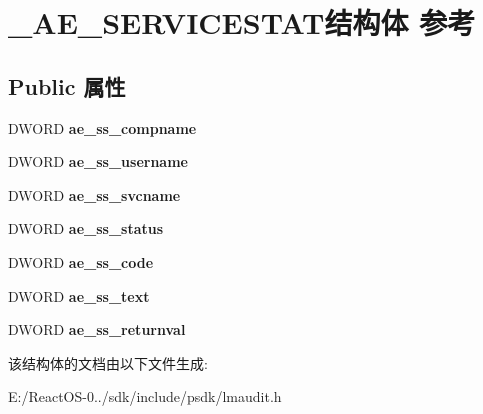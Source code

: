 \hypertarget{struct___a_e___s_e_r_v_i_c_e_s_t_a_t}{}\section{\+\_\+\+A\+E\+\_\+\+S\+E\+R\+V\+I\+C\+E\+S\+T\+A\+T结构体 参考}
\label{struct___a_e___s_e_r_v_i_c_e_s_t_a_t}
\subsection*{Public 属性}
\begin{DoxyCompactItemize}
\item 
\mbox{\label{struct___a_e___s_e_r_v_i_c_e_s_t_a_t_a2477317641e2fb9f72ddf344db135104}} 
D\+W\+O\+RD {\bfseries ae\+\_\+ss\+\_\+compname}
\item 
\mbox{\label{struct___a_e___s_e_r_v_i_c_e_s_t_a_t_aa83a45b295efb3880e1ace4e23b5fed9}} 
D\+W\+O\+RD {\bfseries ae\+\_\+ss\+\_\+username}
\item 
\mbox{\label{struct___a_e___s_e_r_v_i_c_e_s_t_a_t_abf8f866672d85936f0d2d35b3e78169b}} 
D\+W\+O\+RD {\bfseries ae\+\_\+ss\+\_\+svcname}
\item 
\mbox{\label{struct___a_e___s_e_r_v_i_c_e_s_t_a_t_acdc4158484ad0cbc6eb5de8c94ca3022}} 
D\+W\+O\+RD {\bfseries ae\+\_\+ss\+\_\+status}
\item 
\mbox{\label{struct___a_e___s_e_r_v_i_c_e_s_t_a_t_a497cc87c5abfab742533366f46d7af74}} 
D\+W\+O\+RD {\bfseries ae\+\_\+ss\+\_\+code}
\item 
\mbox{\label{struct___a_e___s_e_r_v_i_c_e_s_t_a_t_a9387b5d90388d500b1635b95df299594}} 
D\+W\+O\+RD {\bfseries ae\+\_\+ss\+\_\+text}
\item 
\mbox{\label{struct___a_e___s_e_r_v_i_c_e_s_t_a_t_ad55c8f11a9cff64c095ba1b3ae000949}} 
D\+W\+O\+RD {\bfseries ae\+\_\+ss\+\_\+returnval}
\end{DoxyCompactItemize}


该结构体的文档由以下文件生成\+:\begin{DoxyCompactItemize}
\item 
E\+:/\+React\+O\+S-\/0../sdk/include/psdk/lmaudit.\+h\end{DoxyCompactItemize}
